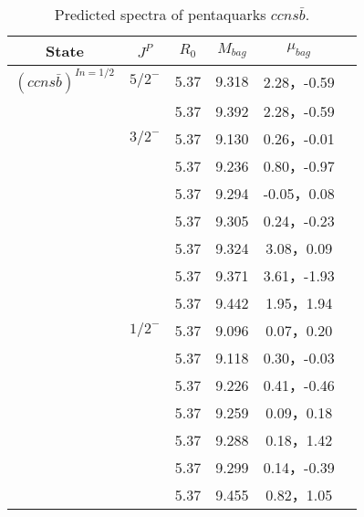 \documentclass[prd,twocolumn,floatfix,nofootinbib]{revtex4}
\begin{document}
\begin{table*}[!htbp]
    \caption{Predicted spectra of pentaquarks $ccns\bar{b}$.}
    \begin{tabular}{cccccc}
        \hline\hline
        {\rm State} &$J^{P}$ &$R_{0}$ &$M_{bag}$ &$\mu_{bag}$ \\ \hline
      ${(ccns\bar{b})}^{I{n}=1/2}$
            &${5/2}^{-}$     &5.37   &9.318 &2.28，-0.59  \\
                         &$ $     &5.37   &9.392 &2.28，-0.59  \\
            &${3/2}^{-}$     &5.37   &9.130 &0.26，-0.01 \\
                         &$ $     &5.37   &9.236 &0.80，-0.97  \\
                         &$ $     &5.37   &9.294 &-0.05，0.08  \\
                         &$ $     &5.37   &9.305 &0.24，-0.23 \\
                         &$ $     &5.37   &9.324 &3.08，0.09 \\
                         &$ $     &5.37   &9.371 &3.61，-1.93  \\
                         &$ $     &5.37   &9.442 &1.95，1.94  \\
            &${1/2}^{-}$     &5.37   &9.096 &0.07，0.20  \\
                         &$ $     &5.37   &9.118 &0.30，-0.03  \\
                         &$ $     &5.37   &9.226 &0.41，-0.46  \\
                         &$ $     &5.37   &9.259 &0.09，0.18 \\
                         &$ $     &5.37   &9.288 &0.18，1.42 \\
                         &$ $     &5.37   &9.299 &0.14，-0.39  \\
                         &$ $     &5.37   &9.455 &0.82，1.05 \\
       \hline\hline
    \end{tabular}
\end{table*}
\end{document}
